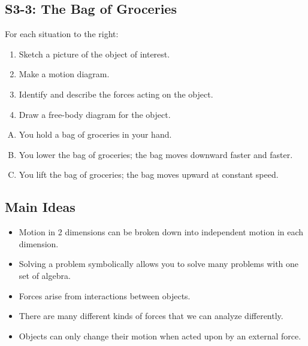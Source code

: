 \documentclass[]{article}
\begin{document}
\begin{PresentSpace}
\vspace{-10pt}
\section*{S3-3: The Bag of Groceries}
\vspace{-10pt}
\begin{multicols}{2}
For each situation to the right:
\begin{enumerate}[(1)]
	\item Sketch a picture of the object of interest.
	\item Make a motion diagram.
	\item Identify and describe the forces acting on the object.
	\item Draw a free-body diagram for the object.
\end{enumerate}
\begin{enumerate}[(A)]
	\item You hold a bag of groceries in your hand.
	\item You lower the bag of groceries; the bag moves downward faster and faster.
	\item You lift the bag of groceries; the bag moves upward at constant speed.
\end{enumerate}
\end{multicols}
\end{PresentSpace}
\newpage
\begin{TeacherMargin}

\end{TeacherMargin}
\begin{PresentSpace}
\section*{Main Ideas}
\begin{itemize}
	\item Motion in 2 dimensions can be broken down into independent motion in each dimension.
	\item Solving a problem symbolically allows you to solve many problems with one set of algebra.
	\item Forces arise from interactions between objects.
	\item There are many different kinds of forces that we can analyze differently.
	\item Objects can only change their motion when acted upon by an external force.
\end{itemize}
\end{PresentSpace}
\end{document}
